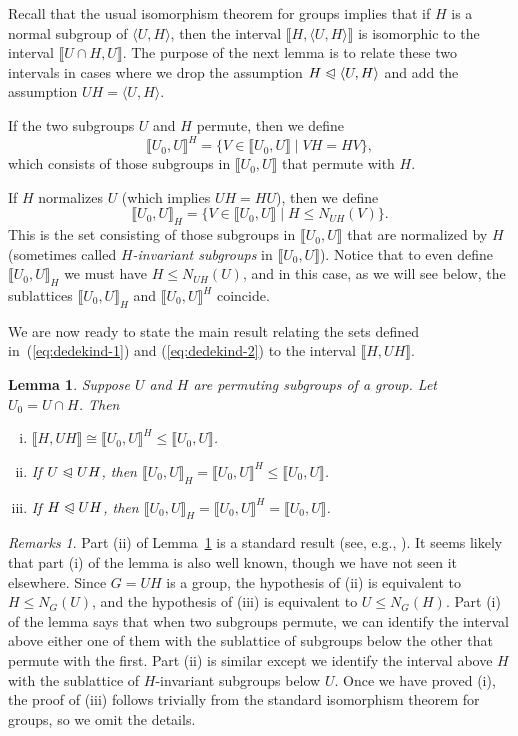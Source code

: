 \documentclass{gen-j-l}
\newcommand{\lb}{\ensuremath{\llbracket}}
\newcommand{\rb}{\ensuremath{\rrbracket}}
\newcommand{\<}{\ensuremath{\langle}}
\renewcommand{\>}{\ensuremath{\rangle}}
\theoremstyle{plain}
\newtheorem{lemma}[theorem]{Lemma}
\theoremstyle{definition}
\theoremstyle{remark}
\newtheorem*{remarks}{Remarks}
\numberwithin{theorem}{section}
\numberwithin{claim}{section}
\numberwithin{equation}{section}
\numberwithin{conjecture}{section}
\renewcommand{\leq}{\ensuremath{\leqslant}}
\newcommand{\subnormal}{\ensuremath{\trianglelefteqslant}}
\newcommand{\2}{\ensuremath{\mathbf{2}}}
\newcommand{\3}{\ensuremath{\mathbf{3}}}
\begin{document}
Recall that the usual isomorphism theorem for groups implies
that 
if $H$ is a normal subgroup of $\<U, H\>$, 
then the interval
$\lb H, \<U, H\> \rb$ is isomorphic to the interval $\lb U\cap H, U \rb$.  The 
purpose of the next lemma is to relate these two
intervals in cases where we drop the assumption $H\subnormal \<U,H\>$
and add the assumption $UH = \<U,H\>$.

If the two subgroups $U$ and $H$ permute, then we define 
\begin{equation}
  \label{eq:dedekind-1}
\lb U_0, U \rb^H = \{ V\in \lb U_0,U \rb \mid VH = HV\},
\end{equation}
which consists of those subgroups in $\lb U_0, U \rb$ that permute with
$H$. 

If $H$ normalizes $U$ (which implies $UH=HU$), 
then we %
define
\begin{equation}
  \label{eq:dedekind-2}
\lb U_0, U \rb_H = \{ V\in \lb U_0,U \rb \mid H\leq N_{UH}(V)\}.
\end{equation}
This is the set consisting of those subgroups in $\lb U_0, U \rb$ that
are normalized by $H$ (sometimes called 
\emph{$H$-invariant subgroups} in $\lb U_0,U \rb$).
Notice that to even
define $\lb U_0, U \rb_H$ we must have $H\leq N_{UH}(U)$, and in this case, as we will
see below, the sublattices 
$\lb U_0, U \rb_H$ and $\lb U_0, U \rb^H$ coincide.

We are now ready to state the main result relating the sets defined
in~(\ref{eq:dedekind-1}) and (\ref{eq:dedekind-2}) %
to the interval $\lb H, UH \rb$.
\begin{lemma}
  \label{lemma-wjd-4}
Suppose $U$ and $H$ are permuting subgroups of a group. %
Let $U_0 = U\cap H$.  Then
\begin{enumerate}[(i)]
\item $\lb H, UH \rb  \cong  \lb U_0, U \rb^H \leq \lb U_0, U \rb$.
\item If $U \subnormal UH$, then  $\lb U_0, U \rb_H  = \lb U_0, U \rb^H \leq \lb U_0, U \rb$.
\item If $H \subnormal UH$,  then  $\lb U_0, U \rb_H  = \lb U_0, U \rb^H = \lb U_0, U \rb$.
\end{enumerate}
\end{lemma}
\begin{remarks}
Part (ii) of Lemma~\ref{lemma-wjd-4} is a standard result (see, e.g.,
\cite{Borner:1999}). It seems likely that part (i) of the lemma is also well
known, though we have not seen it elsewhere. 
Since $G=UH$ is a group, the hypothesis of (ii) is equivalent to
$H\leq N_G(U)$, and the hypothesis of (iii) is equivalent to $U\leq N_G(H)$.
Part (i) of the lemma says that when two subgroups permute, we can
identify the interval above either one of them with the sublattice of
subgroups below the other that permute with the first.
Part (ii) is similar except we identify the interval above $H$ with
the  sublattice of $H$-invariant subgroups below $U$.  Once we have proved (i), the
proof of (iii) follows trivially from the standard isomorphism theorem for
groups, so we omit the details.
\end{remarks}
\end{document}
